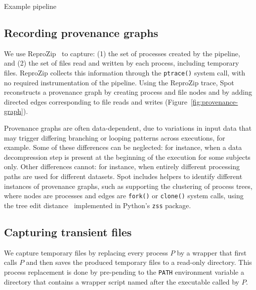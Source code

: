 \documentclass[a4paper,num-refs]{oup-contemporary}
\newcommand{\reprozip}[0]{ReproZip\xspace}
\newcommand{\toolname}[0]{Spot\xspace}
\begin{document}
\begin{listing}
  \inputminted{bash}{"data/example/example.sh"}
  \caption{Example pipeline}
  \label{listing:sample-script}
\end{listing}

\subsection{Recording provenance graphs}

We use \reprozip~\cite{rampin2016reprozip}
to capture: (1) the set of processes created by the
pipeline, and
(2) the set of files read and written by each process, including
temporary files. \reprozip collects this information through the
\texttt{ptrace()} system call, with no required instrumentation of the pipeline.
Using the \reprozip trace, \toolname reconstructs a provenance graph by creating process and file
nodes and by adding directed edges corresponding
to file reads and writes (Figure~\ref{fig:provenance-graph}).

Provenance graphs are often data-dependent, due to variations in input data that
may trigger differing branching or looping patterns across executions, for example.
Some of these differences can be neglected: for instance, when a data
decompression step is present at the beginning of the execution for some
subjects only. Other differences cannot: for instance, when entirely
different processing paths are used for different datasets. \toolname
includes helpers to identify different instances of provenance graphs, 
such as supporting the clustering of process trees, where nodes are processes and
edges are \texttt{fork()} or \texttt{clone()} system calls, using the tree
edit distance~\cite{zhang1989simple} implemented in Python's \texttt{zss} package.

\subsection{Capturing transient files}

We capture temporary files by replacing every
process $P$ by a wrapper that first calls $P$ and then saves the produced
temporary files to a read-only directory. This process replacement is done by pre-pending
 to the \texttt{PATH} environment
variable a directory that contains a wrapper script named after the executable
called by $P$.
\end{document}
